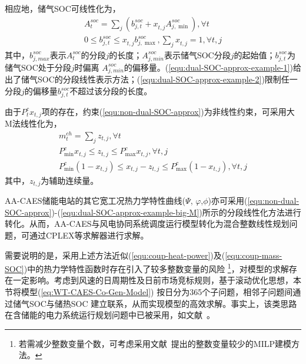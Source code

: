 相应地，储气SOC可线性化为，
\begin{subequations}
\label{equ:dual-SOC-approx-example}
\begin{gather}
A_t^{soc} = \sum\limits_j {({b_{j,t}^{soc} + x_{t,j}^{}A_{j,\min }^{soc}})}, \forall t \label{equ:dual-SOC-approx-example-1} \\
0 \le b_{j,t}^{soc} \le x_{t,j}^{}b_{j,\max }^{soc},\sum\limits_j {x_{t,j}^{}}  = 1, \forall t, j \label{equ:dual-SOC-approx-example-2}
\end{gather}
\end{subequations}
其中，$b_{j,max}^{soc}$表示$A_t^{soc}$的分段$j$的长度；$A_{j,min}^{soc}$表示储气SOC分段$j$的起始值；$b_{j,t}^{soc}$为储气SOC处于分段$j$时偏离 $A_{j,min}^{soc}$的偏移量。(\ref{equ:dual-SOC-approx-example-1})给出了储气SOC的分段线性表示方法；(\ref{equ:dual-SOC-approx-example-2})限制任一分段$j$的偏移量$b_{j,t}^{soc}$不超过该分段的长度。

由于$P_t^cx_{t,j}$项的存在，约束(\ref{equ:non-dual-SOC-approx})为非线性约束，可采用大M法线性化为，
\begin{subequations}
\label{equ:dual-SOC-approx-example-big-M}
\begin{gather}
m_t^{ch} = \sum\limits_j {z_{t,j}}, \forall t \\
P_{\min }^c{x_{t,j}} \le {z_{t,j}} \le P_{\max }^c{x_{t,j}}, \forall t, j\\
P_{\min }^c({1 - {x_{t,j}}})\le {x_{t,j}} - {z_{t,j}} \le P_{\max }^c({1 - {x_{t,j}}}), \forall t,j
\end{gather}
\end{subequations}
其中，$z_{t,j}$为辅助连续量。

AA-CAES储能电站的其它宽工况热力学特性曲线($\Psi$, $\varphi$,$\phi$)亦可采用(\ref{equ:non-dual-SOC-approx})-(\ref{equ:dual-SOC-approx-example-big-M})所示的分段线性化方法进行转化。从而，AA-CAES与风电协同系统调度运行模型转化为混合整数线性规划问题，可通过CPLEX等求解器进行求解。

需要说明的是，采用上述方法近似(\ref{equ:coup-heat-power})及(\ref{equ:coup-mass-SOC})中的热力学特性函数时存在引入了较多整数变量的风险
\footnote{若需减少整数变量个数，可考虑采用文献~提出的整数变量较少的MILP建模方法。}，对模型的求解存在一定影响。考虑到风速的日周期性及日前市场竞标规则，基于滚动优化思想，本节将模型(\ref{eq:WT-CAES-Co-Gen-Model}) 按日分为365个子问题，相邻子问题间通过储气SOC与储热SOC 建立联系，从而实现模型的高效求解。事实上，该类思路在含储能的电力系统运行规划问题中已被采用，如文献~。

